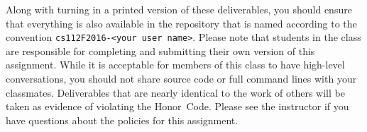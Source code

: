 Along with turning in a printed version of these deliverables, you should ensure that everything is also available in
the repository that is named according to the convention {\tt cs112F2016-<your user name>}. Please note that students in
the class are responsible for completing and submitting their own version of this assignment. While it is acceptable for
members of this class to have high-level conversations, you should not share source code or full command lines with your
classmates. Deliverables that are nearly identical to the work of others will be taken as evidence of violating the
\mbox{Honor Code}. Please see the instructor if you have questions about the policies for this assignment.


